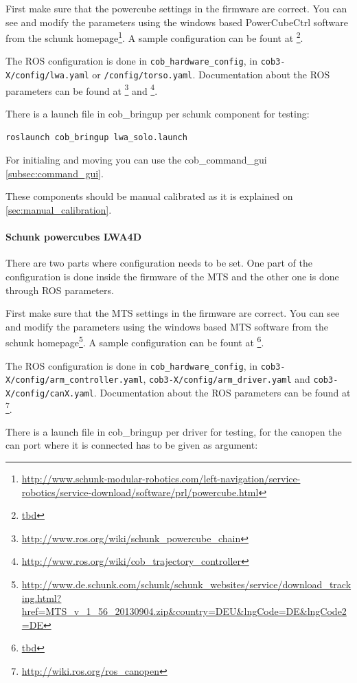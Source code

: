 First make sure that the powercube settings in the firmware are correct. You can see and modify the parameters using the windows based PowerCubeCtrl software from the schunk homepage\footnote{\url{http://www.schunk-modular-robotics.com/left-navigation/service-robotics/service-download/software/prl/powercube.html}}. A sample configuration can be fount at \footnote{\url{tbd}}.

The ROS configuration is done in \texttt{cob\_hardware\_config}, in \texttt{cob3-X/config/lwa.yaml} or \texttt{/config/torso.yaml}. Documentation about the ROS parameters can be found at \footnote{\url{http://www.ros.org/wiki/schunk_powercube_chain}} and \footnote{\url{http://www.ros.org/wiki/cob_trajectory_controller}}.

There is a launch file in cob\_bringup per schunk component for testing:

\begin{lstlisting}
roslaunch cob_bringup lwa_solo.launch
\end{lstlisting}

For initialing and moving you can use the cob\_command\_gui \ref{subsec:command_gui}.

These components should be manual calibrated as it is explained on \ref{sec:manual_calibration}.

\paragraph{Schunk powercubes LWA4D}

There are two parts where configuration needs to be set. One part of the configuration is done inside the firmware of the MTS and the other one is done through ROS parameters.

First make sure that the MTS settings in the firmware are correct. You can see and modify the parameters using the windows based MTS software from the schunk homepage\footnote{\url{http://www.de.schunk.com/schunk/schunk_websites/service/download_tracking.html?href=MTS_v_1_56_20130904.zip&country=DEU&lngCode=DE&lngCode2=DE}}. A sample configuration can be fount at \footnote{\url{tbd}}.

The ROS configuration is done in \texttt{cob\_hardware\_config}, in \texttt{cob3-X/config/arm\_controller.yaml}, \texttt{cob3-X/config/arm\_driver.yaml} and \texttt{cob3-X/config/canX.yaml}. Documentation about the ROS parameters can be found at \footnote{\url{http://wiki.ros.org/ros_canopen}}.


There is a launch file in cob\_bringup per driver for testing, for the canopen the can port where it is connected has to be given as argument:

